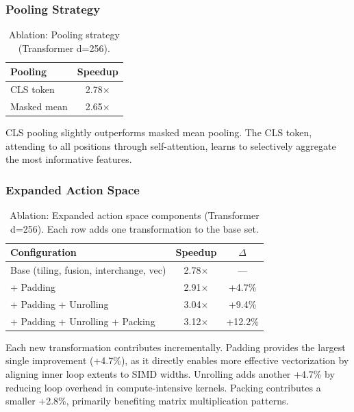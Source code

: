 \documentclass[10pt,twocolumn]{article}
\begin{document}
\subsubsection{Pooling Strategy}

\begin{table}[t]
\centering
\caption{Ablation: Pooling strategy (Transformer d=256).}
\label{tab:abl_pooling}
\begin{tabular}{lc}
\toprule
Pooling & Speedup \\
\midrule
CLS token & 2.78$\times$ \\
Masked mean & 2.65$\times$ \\
\bottomrule
\end{tabular}
\end{table}

CLS pooling slightly outperforms masked mean pooling. The CLS token, attending to all positions through self-attention, learns to selectively aggregate the most informative features.

\subsubsection{Expanded Action Space}

\begin{table}[t]
\centering
\caption{Ablation: Expanded action space components (Transformer d=256). Each row adds one transformation to the base set.}
\label{tab:abl_actions}
\begin{tabular}{lcc}
\toprule
Configuration & Speedup & $\Delta$ \\
\midrule
Base (tiling, fusion, interchange, vec) & 2.78$\times$ & --- \\
+ Padding & 2.91$\times$ & +4.7\% \\
+ Padding + Unrolling & 3.04$\times$ & +9.4\% \\
+ Padding + Unrolling + Packing & 3.12$\times$ & +12.2\% \\
\bottomrule
\end{tabular}
\end{table}

Each new transformation contributes incrementally. Padding provides the largest single improvement (+4.7\%), as it directly enables more effective vectorization by aligning inner loop extents to SIMD widths. Unrolling adds another +4.7\% by reducing loop overhead in compute-intensive kernels. Packing contributes a smaller +2.8\%, primarily benefiting matrix multiplication patterns.
\end{document}
